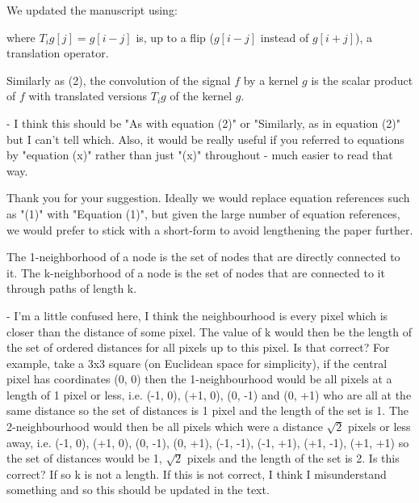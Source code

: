 \documentclass[12pt,a4paper]{article}
\newcommand{\nati}[1]{{\color[rgb]{.1,.6,.1}{NP: #1}}}
\newcommand{\todo}[1]{{\color[rgb]{.6,.1,.6}{TODO: #1}}}
\newcommand{\1}{\b{1}}              %
\newcommand{\0}{\b{0}}              %
\begin{document}
We updated the manuscript using:
\begin{mdframed}[style=manuscript]
where $T_i g[j] = g[i-j]$ is, up to a flip ($g[i-j]$ instead of $g[i+j]$), a translation operator.
\end{mdframed}

\begin{mdframed}[style=comment]
Similarly as (2), the convolution of the signal $f$ by a kernel $g$ is the scalar product of $f$ with translated versions $T_ig$ of the kernel $g$.

- I think this should be "As with equation (2)" or "Similarly, as in equation (2)" but I can't tell which. Also, it would be really useful if you referred to equations by "equation (x)" rather than just "(x)" throughout - much easier to read that way.
\end{mdframed}
Thank you for your suggestion. Ideally we would replace equation references such as "(1)" with "Equation (1)", but given the large number of equation references, we would prefer to stick with a short-form to avoid lengthening the paper further.

\begin{mdframed}[style=comment]
The 1-neighborhood of a node is the set of nodes that are directly connected to it. The k-neighborhood of a node is the set of nodes that are connected to it through paths of length k.

- I'm a little confused here, I think the neighbourhood is every pixel which is closer than the distance of some pixel. The value of k would then be the length of the set of ordered distances for all pixels up to this pixel. Is that correct? For example, take a 3x3 square (on Euclidean space for simplicity), if the central pixel has coordinates (0, 0) then the 1-neighbourhood would be all pixels at a length of 1 pixel or less, i.e. (-1, 0), (+1, 0), (0, -1) and (0, +1) who are all at the same distance so the set of distances is {1} pixel and the length of the set is 1. The 2-neighbourhood would then be all pixels which were a distance $\sqrt{2}$ pixels or less away, i.e. (-1, 0), (+1, 0), (0, -1), (0, +1), (-1, -1), (-1, +1), (+1, -1), (+1, +1) so the set of distances would be {1, $\sqrt{2}$} pixels and the length of the set is 2. Is this correct? If so k is not a length. If this is not correct, I think I misunderstand something and so this should be updated in the text.
\end{mdframed}
\todo{To check: @michael}
\end{document}
